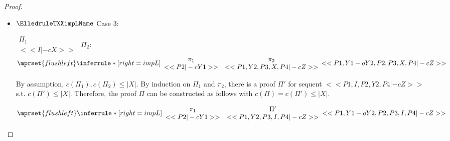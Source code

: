 \begin{proof}
\begin{enumerate}
\begin{itemize}
  \item $\ElledruleTXXimpLName$ Case 3:
      \begin{center}
        \scriptsize
        \begin{math}
          \begin{array}{c}
            \Pi_1 \\
            {<<I |-c X>>}
          \end{array}
        \end{math}
        \qquad\qquad
        $\Pi_2$:
        \begin{math}
          $$\mprset{flushleft}
          \inferrule* [right={\tiny impL}] {
            {
              \begin{array}{cc}
                \pi_1 & \pi_2 \\
                {<<P2 |-c Y1>>} & {<<P1, Y2, P3, X, P4 |-c Z>>}
              \end{array}
            }
          }{<<P1, Y1 -o Y2, P2, P3, X, P4 |-c Z>>}
        \end{math}
      \end{center}
      By assumption, $c(\Pi_1),c(\Pi_2)\leq |X|$. By induction on $\Pi_1$ and $\pi_2$, there is
      a proof $\Pi'$ for sequent $<<P1, I, P2, Y2, P4 |-c Z>>$ s.t. $c(\Pi') \leq |X|$.
      Therefore, the proof $\Pi$ can be constructed as follows with
      $c(\Pi) = c(\Pi') \leq |X|$.
      \begin{center}
        \scriptsize
        \begin{math}
          $$\mprset{flushleft}
          \inferrule* [right={\tiny impL}] {
            {
              \begin{array}{cc}
                \pi_1 & \Pi' \\
                {<<P2 |-c Y1>>} & {<<P1, Y2, P3, I, P4 |-c Z>>}
              \end{array}
            }
          }{<<P1, Y1 -o Y2, P2, P3, I, P4 |-c Z>>}
        \end{math}
      \end{center}


\end{itemize}
\end{enumerate}
\end{proof}
